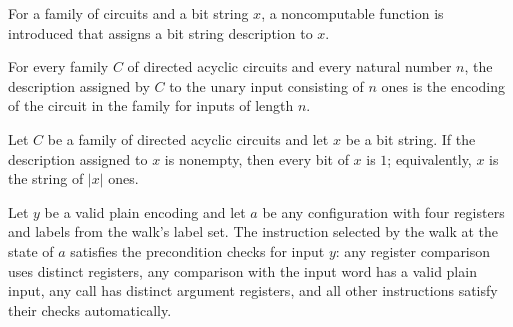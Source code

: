 \begin{definition}
\label{BoolCircuit.AdjWalk.descr}
\leanok
{}
For a family of circuits and a bit string $x$, a noncomputable function is introduced
that assigns a bit string description to $x$.
\end{definition}

\begin{lemma}
\label{BoolCircuit.AdjWalk.descr_replicate}
\leanok
{}
For every family $C$ of directed acyclic circuits and every natural number $n$, the
description assigned by $C$ to the unary input consisting of $n$ ones is the encoding of
the circuit in the family for inputs of length $n$.
\end{lemma}

\begin{lemma}
\label{BoolCircuit.AdjWalk.eq_replicate_of_descr_ne}
\leanok
{}
Let $C$ be a family of directed acyclic circuits and let $x$ be a bit string. If the
description assigned to $x$ is nonempty, then every bit of $x$ is $1$; equivalently, $x$
is the string of $|x|$ ones.
\end{lemma}

\begin{lemma}
\label{BoolCircuit.AdjWalk.preS_walk}
\leanok
{}
Let $y$ be a valid plain encoding and let $a$ be any configuration with four registers
and labels from the walk’s label set. The instruction selected by the walk at the state
of $a$ satisfies the precondition checks for input $y$: any register comparison uses
distinct registers, any comparison with the input word has a valid plain input, any call
has distinct argument registers, and all other instructions satisfy their checks
automatically.
\end{lemma}

